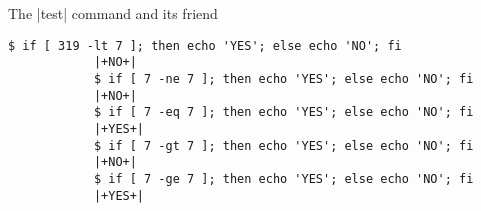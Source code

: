 \begin{frame}[fragile]{The \bash|test| command and its friend \bash{[}}
\begin{onlyenv}
        \begin{lstlisting}[style=MyBash, style=oddnumbers, xleftmargin=8mm, xrightmargin=8mm, aboveskip=2mm]
            $ if [ 319 -lt 7 ]; then echo 'YES'; else echo 'NO'; fi
            |+NO+|
            $ if [ 7 -ne 7 ]; then echo 'YES'; else echo 'NO'; fi
            |+NO+|
            $ if [ 7 -eq 7 ]; then echo 'YES'; else echo 'NO'; fi
            |+YES+|
            $ if [ 7 -gt 7 ]; then echo 'YES'; else echo 'NO'; fi
            |+NO+|
            $ if [ 7 -ge 7 ]; then echo 'YES'; else echo 'NO'; fi
            |+YES+|
        \end{lstlisting}
    \end{onlyenv}
\end{frame}
